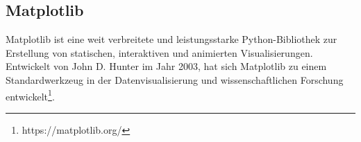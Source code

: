 \subsection{Matplotlib}
Matplotlib ist eine weit verbreitete und leistungsstarke Python-Bibliothek zur Erstellung von statischen, interaktiven und animierten Visualisierungen. Entwickelt von John D. Hunter im Jahr 2003, hat sich Matplotlib zu einem Standardwerkzeug in der Datenvisualisierung und wissenschaftlichen Forschung entwickelt\footnote{https://matplotlib.org/}.